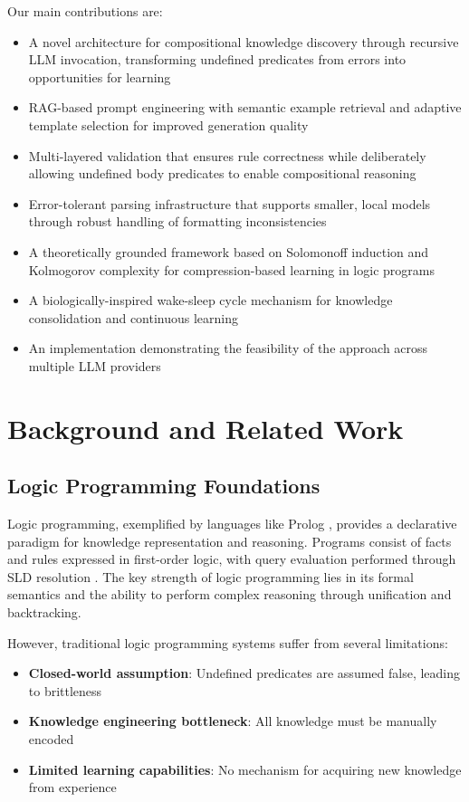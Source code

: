 \documentclass[10pt,conference]{IEEEtran}
\begin{document}
Our main contributions are:
\begin{itemize}
\item A novel architecture for compositional knowledge discovery through recursive LLM invocation, transforming undefined predicates from errors into opportunities for learning
\item RAG-based prompt engineering with semantic example retrieval and adaptive template selection for improved generation quality
\item Multi-layered validation that ensures rule correctness while deliberately allowing undefined body predicates to enable compositional reasoning
\item Error-tolerant parsing infrastructure that supports smaller, local models through robust handling of formatting inconsistencies
\item A theoretically grounded framework based on Solomonoff induction and Kolmogorov complexity for compression-based learning in logic programs
\item A biologically-inspired wake-sleep cycle mechanism for knowledge consolidation and continuous learning
\item An implementation demonstrating the feasibility of the approach across multiple LLM providers
\end{itemize}

\section{Background and Related Work}

\subsection{Logic Programming Foundations}

Logic programming, exemplified by languages like Prolog \cite{sterling1994art}, provides a declarative paradigm for knowledge representation and reasoning. Programs consist of facts and rules expressed in first-order logic, with query evaluation performed through SLD resolution \cite{kowalski1974predicate}. The key strength of logic programming lies in its formal semantics and the ability to perform complex reasoning through unification and backtracking.

However, traditional logic programming systems suffer from several limitations:
\begin{itemize}
\item \textbf{Closed-world assumption}: Undefined predicates are assumed false, leading to brittleness
\item \textbf{Knowledge engineering bottleneck}: All knowledge must be manually encoded
\item \textbf{Limited learning capabilities}: No mechanism for acquiring new knowledge from experience
\end{itemize}
\end{document}
